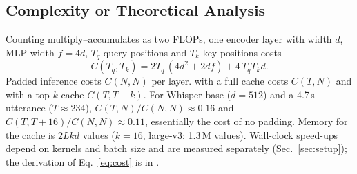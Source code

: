 \subsection{Complexity or Theoretical Analysis}

Counting multiply--accumulates as two FLOPs, one encoder layer with width $d$, MLP width $f=4d$, $T_q$ query positions and $T_k$ key positions costs
\begin{equation}
    C(T_q,T_k)=2T_q\,(4d^2+2df)+4\,T_q T_k d .
    \label{eq:cost}
\end{equation}
Padded inference costs $C(N,N)$ per layer. \method{} with a full cache costs $C(T,N)$ and with a top-$k$ cache $C(T,T{+}k)$. For Whisper-base ($d=512$) and a 4.7\,s utterance ($T\approx234$), $C(T,N)/C(N,N)\approx0.16$ and $C(T,T{+}16)/C(N,N)\approx0.11$, essentially the cost of no padding. Memory for the cache is $2Lkd$ values ($k=16$, large-v3: 1.3\,M values). Wall-clock speed-ups depend on kernels and batch size and are measured separately (Sec.~\ref{sec:setup}); the derivation of Eq.~\eqref{eq:cost} is in .
